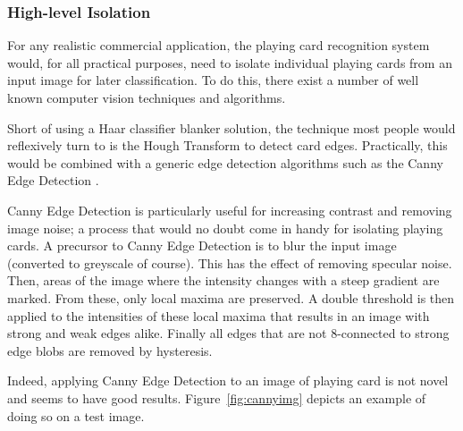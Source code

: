 \documentclass[a4paper,12pt,notitlepage]{article}
\begin{document}
		\subsubsection{High-level Isolation}
			For any realistic commercial application, the playing card recognition system would, for all practical purposes, need to isolate individual playing cards from an input image for later classification. To do this, there exist a number of well known computer vision techniques and algorithms.

			Short of using a Haar classifier blanker solution, the technique most people would reflexively turn to is the Hough Transform \autocite{duda1972use} to detect card edges. Practically, this would be combined with a generic edge detection algorithms such as the Canny Edge Detection \autocite{canny1986computational}.

			Canny Edge Detection is particularly useful for increasing contrast and removing image noise; a process that would no doubt come in handy for isolating playing cards. A precursor to Canny Edge Detection is to blur the input image (converted to greyscale of course). This has the effect of removing specular noise. Then, areas of the image where the intensity changes with a steep gradient are marked. From these, only local maxima are preserved. A double threshold is then applied to the intensities of these local maxima that results in an image with strong and weak edges alike. Finally all edges that are not 8-connected to strong edge blobs are removed by hysteresis.

			Indeed, applying Canny Edge Detection to an image of playing card is not novel and seems to have good results. Figure~\ref{fig:cannyimg} depicts an example of doing so on a test image.
\end{document}
